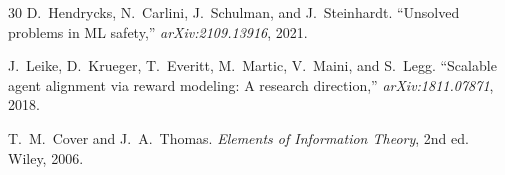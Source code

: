 \documentclass[12pt,a4paper]{article}
\begin{document}
\begin{thebibliography}{30}
D.~Hendrycks, N.~Carlini, J.~Schulman, and J.~Steinhardt.
\newblock ``Unsolved problems in ML safety,''
\newblock \emph{arXiv:2109.13916}, 2021.

J.~Leike, D.~Krueger, T.~Everitt, M.~Martic, V.~Maini, and S.~Legg.
\newblock ``Scalable agent alignment via reward modeling: A research
direction,''
\newblock \emph{arXiv:1811.07871}, 2018.

T.~M.~Cover and J.~A.~Thomas.
\newblock \emph{Elements of Information Theory}, 2nd ed.
\newblock Wiley, 2006.

\end{thebibliography}
\end{document}
